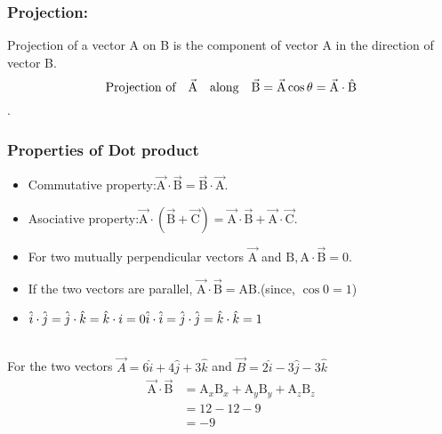 \subsubsection{Projection:}Projection of a vector A on B is the component of vector A in the direction of vector B.$$\text{Projection of}\quad \vec{\mathrm A} \text{\quad along}\quad \vec{\mathrm B} =\vec{\mathrm A}\cos\theta =\vec{\mathrm A} \cdot \hat{\mathrm B}$$.
\subsubsection{Properties of Dot product}
\begin{itemize}
	\item Commutative property:$\vec{\mathrm A} \cdot \vec{\mathrm B} =\vec{\mathrm B} \cdot \vec{\mathrm A}$.
	\item Asociative property:$ \vec{\mathrm A} \cdot(\vec{\mathrm B}+\vec{\mathrm C}) =\vec{\mathrm A} \cdot \vec{\mathrm B}+\vec{\mathrm A} \cdot \vec{\mathrm C}$.
	\item For two mutually perpendicular vectors $\vec{\mathrm A}$ and $\mathrm B, \mathrm A \cdot \vec{\mathrm B}=0$.
	\item If the two vectors are parallel, $\vec{\mathrm A} \cdot \vec{\mathrm B}=\mathrm {A B}$.(since, $\cos0=1$)
	\item $\hat{i} \cdot \hat{j}=\hat{j} \cdot \hat{k}=\hat{k} \cdot i=0\newline  \hat{i} \cdot \hat{i}=\hat{j}\cdot\hat{j} = \hat{k}\cdot \hat{k}=1$\\\\ 
\end{itemize}
\begin{exercise}
	For the two vectors  $ \vec{A}=6\hat{i}+4\hat{j}+3\hat{k}$ and $ \vec{B}=2\hat{i}-3\hat{j}-3\hat{k}$
	\newline  $$\begin{aligned}
	\vec{\mathrm A} \cdot \vec{ \mathrm B}&=\mathrm A_{x} \mathrm B_{x}+\mathrm A_{y} \mathrm B_{y}+\mathrm A_{z} \mathrm B_{z}\\
	&=12-12-9\\
	&=-9
	\end{aligned}$$
\end{exercise}
